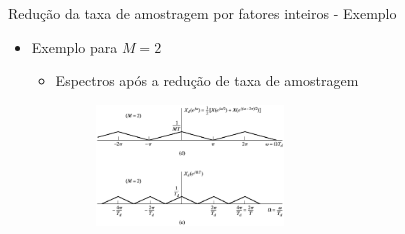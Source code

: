 \begin{slide}{Redução da taxa de amostragem por fatores inteiros - Exemplo}
	\begin{itemize}
		\item Exemplo para $M=2$
			\begin{itemize}
		\item Espectros após a redução de taxa de amostragem 
			\begin{figure}
				\centering
				\includegraphics[width=0.5\textwidth]{figs/4-20de.eps}
		        \end{figure}
			\end{itemize}
	\end{itemize}
\end{slide} 

